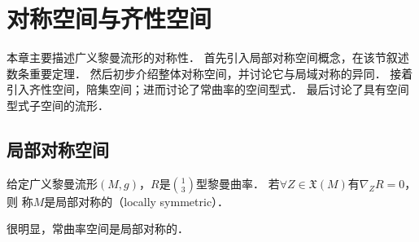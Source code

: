 
\chapter{对称空间与齐性空间}\label{chhss}

本章主要描述广义黎曼流形的对称性．
首先引入局部对称空间概念，在该节叙述数条重要定理．
然后初步介绍整体对称空间，并讨论它与局域对称的异同．
接着引入齐性空间，陪集空间；进而讨论了常曲率的空间型式．
最后讨论了具有空间型式子空间的流形．


\section{局部对称空间}

\begin{definition}\label{chhss:def_local-symmetry}
    给定广义黎曼流形$(M,g)$，$R$是$\binom{1}{3}$型黎曼曲率．
    若$\forall Z \in \mathfrak{X}(M)$有$\nabla_Z R=0$，则
    称$M$是{\heiti 局部对称}的（locally symmetric）．
\end{definition}

很明显，常曲率空间是局部对称的．

